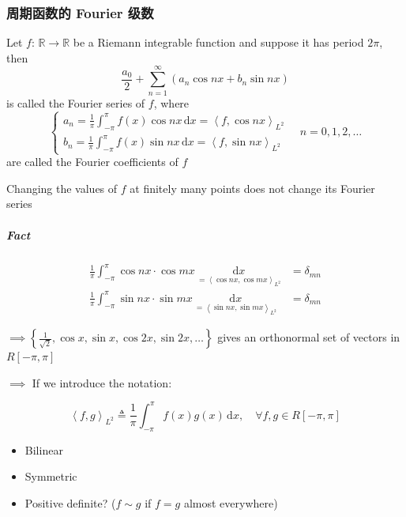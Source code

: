 



\subsubsection{周期函数的 Fourier 级数}

\begin{definition}
    Let $f:\,\mathbb{R}\to\mathbb{R}$ be a Riemann integrable function and suppose it has period $2\pi$, then
    $$\frac{a_0}{2}+\sum_{n=1}^{\infty}\left(a_n\cos nx+b_n\sin nx\right)$$
    is called the Fourier series of $f$, where
    $$\begin{cases}
            a_n=\frac{1}{\pi}\int_{-\pi}^{\pi}f(x)\cos nx\,\mathrm{d}x=\left<f,\cos nx\right>_{L^2} \\
            b_n=\frac{1}{\pi}\int_{-\pi}^{\pi}f(x)\sin nx\,\mathrm{d}x=\left<f,\sin nx\right>_{L^2}
        \end{cases}\quad n=0,1,2,\dots$$
    are called the Fourier coefficients of $f$
\end{definition}

\begin{remark}
    Changing the values of $f$ at finitely many points does not change its Fourier series
\end{remark}

\subparagraph*{Fact}

\begin{align*}
    \frac{1}{\pi}\int_{-\pi}^{\pi}\cos nx\cdot\cos mx\,\underset{=\left<\cos nx,\cos mx\right>_{L^2}}{\mathrm{d}x} & =\delta_{mn} \\
    \frac{1}{\pi}\int_{-\pi}^{\pi}\sin nx\cdot\sin mx\,\underset{=\left<\sin nx,\sin mx\right>_{L^2}}{\mathrm{d}x} & =\delta_{mn}
\end{align*}

$\implies\left\{\frac{1}{\sqrt{2}},\cos x,\sin x,\cos 2x,\sin 2x,\dots\right\}$ gives an orthonormal set of vectors in $R[-\pi,\pi]$

$\implies$ If we introduce the notation:

$$\left<f,g\right>_{L^2}\triangleq\frac{1}{\pi}\int_{-\pi}^{\pi}f(x)g(x)\,\mathrm{d}x,\quad\forall f,g\in R[-\pi,\pi]$$

\begin{itemize}
    \item Bilinear
    \item Symmetric
    \item Positive definite? ($f\sim g$ if $f=g$ almost everywhere)
\end{itemize}

